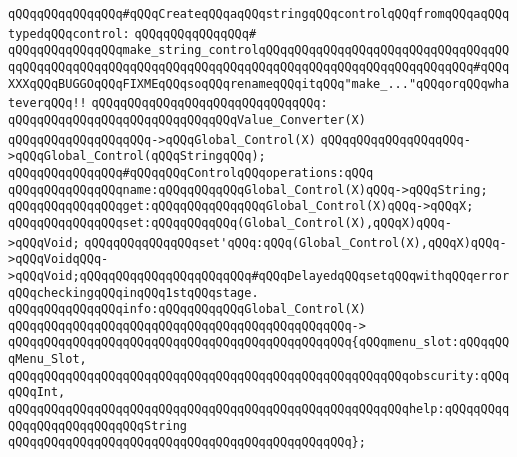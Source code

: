 \newline
\newline
\newline
\verb|qQQqqQQqqQQqqQQq#qQQqCreateqQQqaqQQqstringqQQqcontrolqQQqfromqQQqaqQQqtypedqQQqcontrol:|\newline
\verb|qQQqqQQqqQQqqQQq#|\newline
\verb|qQQqqQQqqQQqqQQqmake_string_controlqQQqqQQqqQQqqQQqqQQqqQQqqQQqqQQqqQQqqQQqqQQqqQQqqQQqqQQqqQQqqQQqqQQqqQQqqQQqqQQqqQQqqQQqqQQqqQQqqQQq#qQQqXXXqQQqBUGGOqQQqFIXMEqQQqsoqQQqrenameqQQqitqQQq"make_..."qQQqorqQQqwhateverqQQq!!|\newline
\verb|qQQqqQQqqQQqqQQqqQQqqQQqqQQqqQQq:|\newline
\verb|qQQqqQQqqQQqqQQqqQQqqQQqqQQqqQQqValue_Converter(X)|\newline
\verb|qQQqqQQqqQQqqQQqqQQq->qQQqGlobal_Control(X)|\newline
\verb|qQQqqQQqqQQqqQQqqQQq->qQQqGlobal_Control(qQQqStringqQQq);|\newline
\newline
\newline
\newline
\verb|qQQqqQQqqQQqqQQq#qQQqqQQqControlqQQqoperations:qQQq|\newline
\verb|qQQqqQQqqQQqqQQqname:qQQqqQQqqQQqGlobal_Control(X)qQQq->qQQqString;|\newline
\verb|qQQqqQQqqQQqqQQqget:qQQqqQQqqQQqqQQqGlobal_Control(X)qQQq->qQQqX;|\newline
\verb|qQQqqQQqqQQqqQQqset:qQQqqQQqqQQq(Global_Control(X),qQQqX)qQQq->qQQqVoid;|\newline
\verb|qQQqqQQqqQQqqQQqset'qQQq:qQQq(Global_Control(X),qQQqX)qQQq->qQQqVoidqQQq->qQQqVoid;qQQqqQQqqQQqqQQqqQQqqQQq#qQQqDelayedqQQqsetqQQqwithqQQqerrorqQQqcheckingqQQqinqQQq1stqQQqstage.|\newline
\newline
\verb|qQQqqQQqqQQqqQQqinfo:qQQqqQQqqQQqGlobal_Control(X)|\newline
\verb|qQQqqQQqqQQqqQQqqQQqqQQqqQQqqQQqqQQqqQQqqQQqqQQq->|\newline
\verb|qQQqqQQqqQQqqQQqqQQqqQQqqQQqqQQqqQQqqQQqqQQqqQQq{qQQqmenu_slot:qQQqqQQqMenu_Slot,|\newline
\verb|qQQqqQQqqQQqqQQqqQQqqQQqqQQqqQQqqQQqqQQqqQQqqQQqqQQqqQQqobscurity:qQQqqQQqInt,|\newline
\verb|qQQqqQQqqQQqqQQqqQQqqQQqqQQqqQQqqQQqqQQqqQQqqQQqqQQqqQQqhelp:qQQqqQQqqQQqqQQqqQQqqQQqqQQqString|\newline
\verb|qQQqqQQqqQQqqQQqqQQqqQQqqQQqqQQqqQQqqQQqqQQqqQQq};|\newline
